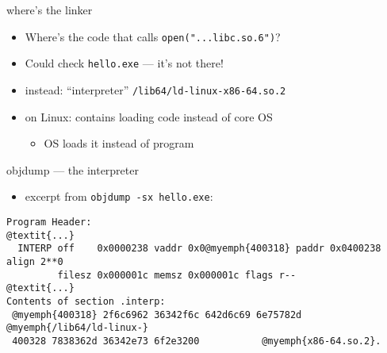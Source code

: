 
\begin{frame}{where's the linker}
\begin{itemize}
    \item Where's the code that calls {\tt open("...libc.so.6")}?
    \item Could check {\tt hello.exe} --- it's not there!
    \vspace{.5cm}
    \item<2> instead: ``interpreter'' {\tt /lib64/ld-linux-x86-64.so.2}
    \item<2> on Linux: contains loading code instead of core OS
        \begin{itemize}
        \item OS loads it instead of program
        \end{itemize}
\end{itemize}
\end{frame}

\begin{frame}[fragile,label=interpObjdump]{objdump --- the interpreter}
\begin{itemize}
\item excerpt from {\tt objdump -sx hello.exe}:
\end{itemize}
\begin{Verbatim}[commandchars=@\{\},fontsize=\fontsize{8}{9}\selectfont]
Program Header:
@textit{...}
  INTERP off    0x0000238 vaddr 0x0@myemph{400318} paddr 0x0400238 align 2**0
         filesz 0x000001c memsz 0x000001c flags r--
@textit{...}
Contents of section .interp:
 @myemph{400318} 2f6c6962 36342f6c 642d6c69 6e75782d  @myemph{/lib64/ld-linux-}
 400328 7838362d 36342e73 6f2e3200           @myemph{x86-64.so.2}.    
\end{Verbatim}
\end{frame}
